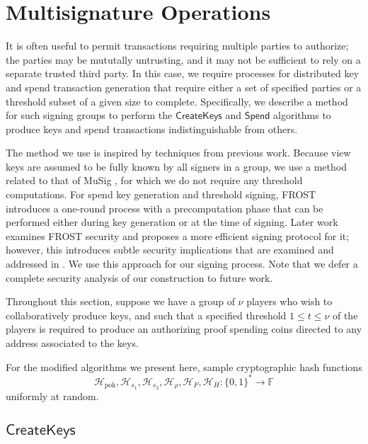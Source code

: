 \documentclass{llncs}
\newcommand{\F}{\mathbb{F}}
\newcommand{\hash}{\mathcal{H}}
\newcommand{\func}[1]{\mathsf{#1}}
\begin{document}
\section{Multisignature Operations}

It is often useful to permit transactions requiring multiple parties to authorize; the parties may be mututally untrusting, and it may not be sufficient to rely on a separate trusted third party.
In this case, we require processes for distributed key and spend transaction generation that require either a set of specified parties or a threshold subset of a given size to complete.
Specifically, we describe a method for such signing groups to perform the $\func{CreateKeys}$ and $\func{Spend}$ algorithms to produce keys and spend transactions indistinguishable from others.

The method we use is inspired by techniques from previous work.
Because view keys are assumed to be fully known by all signers in a group, we use a method related to that of MuSig \cite{musig}, for which we do not require any threshold computations.
For spend key generation and threshold signing, FROST \cite{frost} introduces a one-round process with a precomputation phase that can be performed either during key generation or at the time of signing.
Later work \cite{schnorrwithschnorr} examines FROST security and proposes a more efficient signing protocol for it; however, this introduces subtle security implications that are examined and addressed in \cite{bellare_frost}.
We use this approach for our signing process.
Note that we defer a complete security analysis of our construction to future work.

Throughout this section, suppose we have a group of $\nu$ players who wish to collaboratively produce keys, and such that a specified threshold $1 \leq t \leq \nu$ of the players is required to produce an authorizing proof spending coins directed to any address associated to the keys.

For the modified algorithms we present here, sample cryptographic hash functions $$\hash_{\text{pok}},\hash_{s_1},\hash_{s_2},\hash_{\rho},\hash_{F},\hash_{H}: \{0,1\}^* \to \F$$ uniformly at random.


\subsection{\texorpdfstring{$\func{CreateKeys}$}{CreateKeys}}
\end{document}
